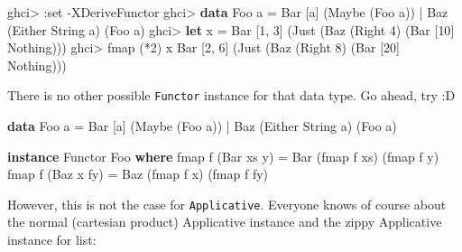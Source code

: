 \documentclass[]{article}
\newenvironment{Shaded}{}{}
\newcommand{\KeywordTok}[1]{\textcolor[rgb]{0.00,0.44,0.13}{\textbf{{#1}}}}
\newcommand{\DataTypeTok}[1]{\textcolor[rgb]{0.56,0.13,0.00}{{#1}}}
\newcommand{\DecValTok}[1]{\textcolor[rgb]{0.25,0.63,0.44}{{#1}}}
\newcommand{\FunctionTok}[1]{\textcolor[rgb]{0.02,0.16,0.49}{{#1}}}
\newcommand{\NormalTok}[1]{{#1}}
\begin{document}
\begin{Shaded}
\begin{Highlighting}[]
\NormalTok{ghci}\FunctionTok{>} \FunctionTok{:}\NormalTok{set }\FunctionTok{-}\DataTypeTok{XDeriveFunctor}
\NormalTok{ghci}\FunctionTok{>} \KeywordTok{data} \DataTypeTok{Foo} \NormalTok{a }\FunctionTok{=} \DataTypeTok{Bar} \NormalTok{[a] (}\DataTypeTok{Maybe} \NormalTok{(}\DataTypeTok{Foo} \NormalTok{a)) }\FunctionTok{|} \DataTypeTok{Baz} \NormalTok{(}\DataTypeTok{Either} \DataTypeTok{String} \NormalTok{a) (}\DataTypeTok{Foo} \NormalTok{a)}
\NormalTok{ghci}\FunctionTok{>} \KeywordTok{let} \NormalTok{x }\FunctionTok{=} \DataTypeTok{Bar} \NormalTok{[}\DecValTok{1}\NormalTok{, }\DecValTok{3}\NormalTok{] (}\DataTypeTok{Just} \NormalTok{(}\DataTypeTok{Baz} \NormalTok{(}\DataTypeTok{Right} \DecValTok{4}\NormalTok{) (}\DataTypeTok{Bar} \NormalTok{[}\DecValTok{10}\NormalTok{] }\DataTypeTok{Nothing}\NormalTok{)))}
\NormalTok{ghci}\FunctionTok{>} \NormalTok{fmap (}\FunctionTok{*}\DecValTok{2}\NormalTok{) x}
\DataTypeTok{Bar} \NormalTok{[}\DecValTok{2}\NormalTok{, }\DecValTok{6}\NormalTok{] (}\DataTypeTok{Just} \NormalTok{(}\DataTypeTok{Baz} \NormalTok{(}\DataTypeTok{Right} \DecValTok{8}\NormalTok{) (}\DataTypeTok{Bar} \NormalTok{[}\DecValTok{20}\NormalTok{] }\DataTypeTok{Nothing}\NormalTok{)))}
\end{Highlighting}
\end{Shaded}

There is no other possible \texttt{Functor} instance for that data type.
Go ahead, try :D

\begin{Shaded}
\begin{Highlighting}[]
\KeywordTok{data} \DataTypeTok{Foo} \NormalTok{a }\FunctionTok{=} \DataTypeTok{Bar} \NormalTok{[a] (}\DataTypeTok{Maybe} \NormalTok{(}\DataTypeTok{Foo} \NormalTok{a)) }\FunctionTok{|} \DataTypeTok{Baz} \NormalTok{(}\DataTypeTok{Either} \DataTypeTok{String} \NormalTok{a) (}\DataTypeTok{Foo} \NormalTok{a)}

\KeywordTok{instance} \DataTypeTok{Functor} \DataTypeTok{Foo} \KeywordTok{where}
    \NormalTok{fmap f (}\DataTypeTok{Bar} \NormalTok{xs y) }\FunctionTok{=} \DataTypeTok{Bar} \NormalTok{(fmap f xs) (fmap f y)}
    \NormalTok{fmap f (}\DataTypeTok{Baz} \NormalTok{x fy) }\FunctionTok{=} \DataTypeTok{Baz} \NormalTok{(fmap f x) (fmap f fy)}
\end{Highlighting}
\end{Shaded}

However, this is not the case for \texttt{Applicative}. Everyone knows
of course about the normal (cartesian product) Applicative instance and
the zippy Applicative instance for list:
\end{document}
